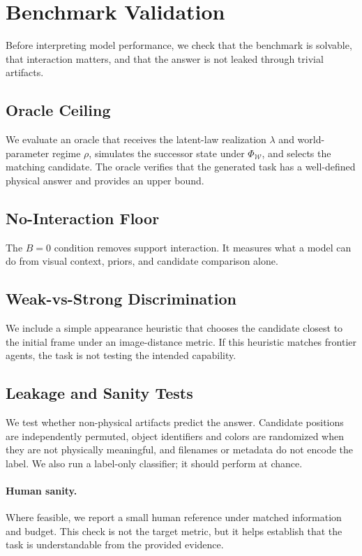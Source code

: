 \section{Benchmark Validation}
\label{sec:validation}

Before interpreting model performance, we check that the benchmark is solvable, that interaction matters, and that the answer is not leaked through trivial artifacts.

\subsection{Oracle Ceiling}

We evaluate an oracle that receives the latent-law realization $\lambda$ and world-parameter regime $\rho$, simulates the successor state under $\Phi_{\mathcal{W}}$, and selects the matching candidate. The oracle verifies that the generated task has a well-defined physical answer and provides an upper bound. 

\subsection{No-Interaction Floor}

The $B=0$ condition removes support interaction. It measures what a model can do from visual context, priors, and candidate comparison alone. 

\subsection{Weak-vs-Strong Discrimination}

We include a simple appearance heuristic that chooses the candidate closest to the initial frame under an image-distance metric. If this heuristic matches frontier agents, the task is not testing the intended capability. 

\subsection{Leakage and Sanity Tests}

We test whether non-physical artifacts predict the answer. Candidate positions are independently permuted, object identifiers and colors are randomized when they are not physically meaningful, and filenames or metadata do not encode the label. We also run a label-only classifier; it should perform at chance. 

\paragraph{Human sanity.} Where feasible, we report a small human reference under matched information and budget. This check is not the target metric, but it helps establish that the task is understandable from the provided evidence. 
